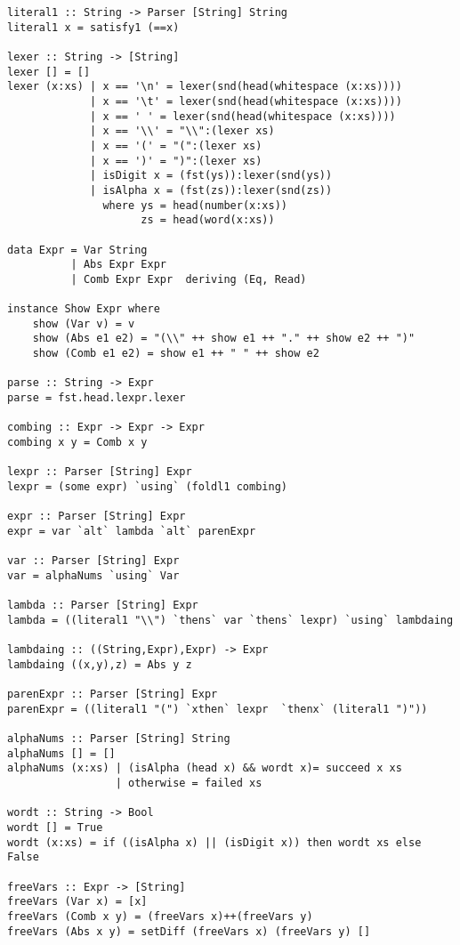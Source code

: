 \documentclass[11pt]{article}
\begin{document}
\begin{verbatim}
literal1 :: String -> Parser [String] String
literal1 x = satisfy1 (==x)

lexer :: String -> [String]
lexer [] = []
lexer (x:xs) | x == '\n' = lexer(snd(head(whitespace (x:xs))))
             | x == '\t' = lexer(snd(head(whitespace (x:xs))))
             | x == ' ' = lexer(snd(head(whitespace (x:xs))))
             | x == '\\' = "\\":(lexer xs)
             | x == '(' = "(":(lexer xs)
             | x == ')' = ")":(lexer xs)
             | isDigit x = (fst(ys)):lexer(snd(ys))
             | isAlpha x = (fst(zs)):lexer(snd(zs))
               where ys = head(number(x:xs))
                     zs = head(word(x:xs))

data Expr = Var String 
          | Abs Expr Expr 
          | Comb Expr Expr  deriving (Eq, Read)

instance Show Expr where
    show (Var v) = v
    show (Abs e1 e2) = "(\\" ++ show e1 ++ "." ++ show e2 ++ ")"
    show (Comb e1 e2) = show e1 ++ " " ++ show e2

parse :: String -> Expr
parse = fst.head.lexpr.lexer

combing :: Expr -> Expr -> Expr
combing x y = Comb x y

lexpr :: Parser [String] Expr
lexpr = (some expr) `using` (foldl1 combing)

expr :: Parser [String] Expr
expr = var `alt` lambda `alt` parenExpr

var :: Parser [String] Expr
var = alphaNums `using` Var

lambda :: Parser [String] Expr
lambda = ((literal1 "\\") `thens` var `thens` lexpr) `using` lambdaing

lambdaing :: ((String,Expr),Expr) -> Expr
lambdaing ((x,y),z) = Abs y z

parenExpr :: Parser [String] Expr
parenExpr = ((literal1 "(") `xthen` lexpr  `thenx` (literal1 ")")) 

alphaNums :: Parser [String] String
alphaNums [] = []
alphaNums (x:xs) | (isAlpha (head x) && wordt x)= succeed x xs
                 | otherwise = failed xs

wordt :: String -> Bool
wordt [] = True
wordt (x:xs) = if ((isAlpha x) || (isDigit x)) then wordt xs else False

freeVars :: Expr -> [String]
freeVars (Var x) = [x]
freeVars (Comb x y) = (freeVars x)++(freeVars y)
freeVars (Abs x y) = setDiff (freeVars x) (freeVars y) []


\end{verbatim}
\end{document}
